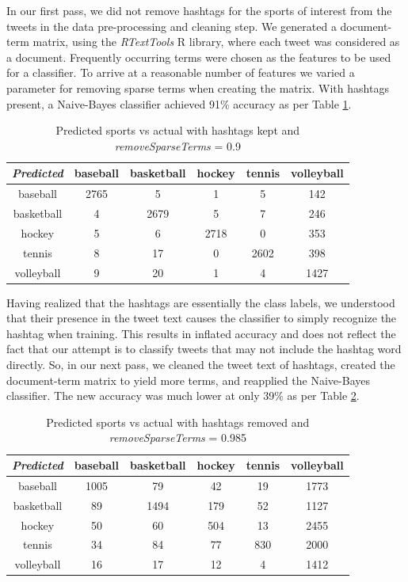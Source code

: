 \documentclass[journal, a4paper]{IEEEtran}
\begin{document}
In our first pass, we did not remove hashtags for the sports of interest from the tweets in the data pre-processing and cleaning step. We generated a document-term matrix, using the \textit{RTextTools} R library, where each tweet was considered as a document. Frequently occurring terms were chosen as the features to be used for a classifier. To arrive at a reasonable number of features we varied a parameter for removing sparse terms when creating the matrix. With hashtags present, a Naive-Bayes classifier achieved 91\% accuracy as per Table \ref{Tab:2}.
\begin{table}[!ht]
	\begin{center}
		\begin{tabular}{|c|c c c c c|}
			\hline
			\textit{Predicted}& baseball & basketball & hockey & tennis& volleyball\\
			\hline
			baseball & 2765 & 5 & 1 & 5 &142\\
			basketball & 4 & 2679&5& 7& 246\\
			hockey & 5 & 6 & 2718 & 0 & 353\\
			tennis & 8 & 17 & 0 & 2602 & 398\\
			volleyball & 9 & 20&  1 & 4 &1427\\
			\hline
		\end{tabular}
	\end{center}
	\caption{Predicted sports vs actual with hashtags kept and \textit{removeSparseTerms} = 0.9}\label{Tab:2}
\end{table}

Having realized that the hashtags are essentially the class labels, we understood that their presence in the tweet text causes the classifier to simply recognize the hashtag when training. This results in inflated accuracy and does not reflect the fact that our attempt is to classify tweets that may not include the hashtag word directly. So, in our next pass, we cleaned the tweet text of hashtags, created the document-term matrix to yield more terms, and reapplied the Naive-Bayes classifier. The new accuracy was much lower at only 39\% as per Table \ref{Tab:3}.
\begin{table}[ht]
	\begin{center}
		\begin{tabular}{|c|c c c c c|}
			\hline
			\textit{Predicted}& baseball & basketball & hockey & tennis& volleyball\\
			\hline
			baseball &1005&79&42&19&1773\\
			basketball & 89 & 1494& 179 & 52 & 1127\\
			hockey &50&60&504&13&2455\\
			tennis &34&84&77&830&2000\\
			volleyball& 16 & 17 & 12 & 4&1412\\
			\hline
		\end{tabular}
	\end{center}
	\caption{Predicted sports vs actual with hashtags removed and \textit{removeSparseTerms} = 0.985}\label{Tab:3}
\end{table}
\end{document}
